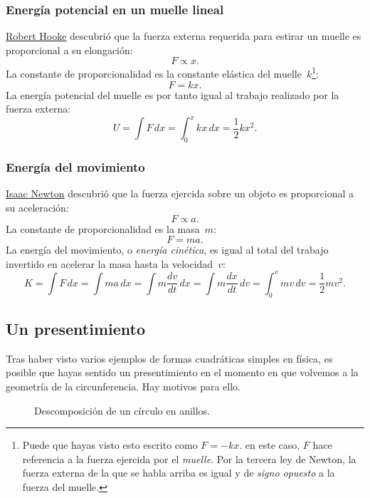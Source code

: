     \subsubsection{Energía potencial en un muelle lineal} %
    \label{sec:potential_energy_in_a_linear_spring}

\href{https://es.wikipedia.org/wiki/Robert_Hooke}{Robert Hooke} descubrió que la fuerza externa requerida para estirar un muelle es proporcional a su elongación:
\[ F \propto x. \]
La constante de proporcionalidad es la constante elástica del muelle~$k$\footnote{Puede que hayas visto esto escrito como $F = -kx$. en este caso, $F$ hace referencia a la fuerza ejercida por el \emph{muelle}. Por la tercera ley de Newton, la fuerza externa de la que se habla arriba es igual y de \emph{signo opuesto} a la fuerza del muelle.}:
\[ F = k x. \]
La energía potencial del muelle es por tanto igual al trabajo realizado por la fuerza externa:
\[ U = \int F\,dx = \int_0^x kx\,dx = \textstyle{\frac{1}{2}} kx^2. \]

    \subsubsection{Energía del movimiento} %
    \label{sec:energy_of_motion}

\href{https://es.wikipedia.org/wiki/Isaac_Newton}{Isaac Newton} descubrió que la fuerza ejercida sobre un objeto es proporcional a su aceleración:
\[ F \propto a. \]
La constante de proporcionalidad es la masa~$m$:
\[ F = m a. \]
La energía del movimiento, o \emph{energía cinética}, es igual al total del trabajo invertido en acelerar la masa hasta la velocidad~$v$:
\[ K = \int F\,dx = \int ma\,dx = \int m\frac{dv}{dt}\,dx = \int m\frac{dx}{dt}\,dv = \int_0^v mv\,dv = \textstyle{\frac{1}{2}} mv^2. \]

  \subsection{Un presentimiento} %
  \label{sec:a_sense_of_foreboding}

Tras haber visto varios ejemplos de formas cuadráticas simples en física, es posible que hayas sentido un presentimiento en el momento en que volvemos a la geometría de la circunferencia. Hay motivos para ello.

\begin{figure}
\begin{center}
\end{center}
\caption{Descomposición de un círculo en anillos.\label{fig:circular_area}}
\end{figure}

